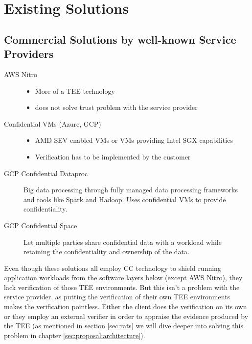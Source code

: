 \section{Existing Solutions}

\subsection{Commercial Solutions by well-known Service Providers}

\begin{description}
  \item[AWS Nitro]
    \begin{itemize}
      \item More of a TEE technology
      \item does not solve trust problem with the service provider
    \end{itemize}
  \item[Confidential VMs (Azure, GCP)]
    \begin{itemize}
      \item AMD SEV enabled VMs or VMs providing Intel SGX capabilities
      \item Verification has to be implemented by the customer
    \end{itemize}
  \item[GCP Confidential Dataproc]
    Big data processing through fully managed data processing frameworks and
    tools like Spark and Hadoop. Uses confidential VMs to provide
    confidentiality.
  \item[GCP Confidential Space]
    Let multiple parties share confidential data with a workload while retaining
    the confidentiality and ownership of the data.
\end{description}

Even though these solutions all employ CC technology to shield running
application workloads from the software layers below (except AWS Nitro), they
lack verification of those TEE environments. But this isn't a problem with the
service provider, as putting the verification of their own TEE environments
makes the verification pointless. Either the client does the verification on its
own or they employ an external verifier in order to appraise the evidence
produced by the TEE (as mentioned in section \ref{sec:rats} we will dive deeper
into solving this problem in chapter \ref{sec:proposal:architecture}).

